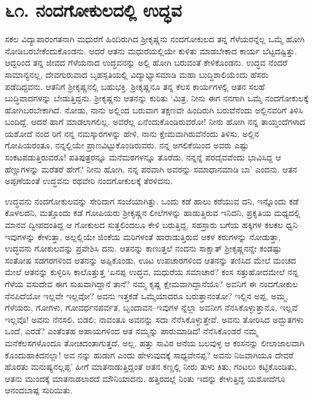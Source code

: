 
\chapter{೬೧. ನಂದಗೋಕುಲದಲ್ಲಿ ಉದ್ಧವ}

ಸಕಲ ವಿದ್ಯಾಪಾರಂಗತನಾಗಿ ಮಧುರೆಗೆ ಹಿಂದಿರುಗಿದ ಶ್ರೀಕೃಷ್ಣನು ನಂದಗೋಕುಲದ ತನ್ನ ಗೆಳೆಯರನ್ನೆಲ್ಲ ಒಮ್ಮೆ ಹೋಗಿ ನೋಡಿಬರಬೇಕೆಂದುಕೊಂಡನು. ಆದರೆ ಆತನು ಮಧುರೆಯಲ್ಲಿಯೇ ಕುಳಿತು ಮಾಡಬೇಕಾದ ಕಾರ್ಯ ಬೆಟ್ಟದಷ್ಟಿತ್ತು. ಆದ್ದರಿಂದ ತನ್ನ ಜೀವದ ಗೆಳೆಯನಾದ ಉದ್ಧವನನ್ನು ಅಲ್ಲಿ ಹೋಗಿ ಬರುವಂತೆ ಕೇಳಿಕೊಂಡನು. ಉದ್ಧವ ನೆಂದರೆ ಸಾಮಾನ್ಯನಲ್ಲ, ದೇವಗುರುವಾದ ಬೃಹಸ್ಪತಿಯಲ್ಲಿ ವಿದ್ಯಾಭ್ಯಾಸಮಾಡಿ ಮಹಾ ಬುದ್ಧಿಶಾಲಿಯೆಂದು ಹೆಸರು ಪಡೆದಿದ್ದವನು. ಆತನಿಗೆ ಶ್ರೀಕೃಷ್ಣನಲ್ಲಿ ಬಹುಭಕ್ತಿ. ಶ್ರೀಕೃಷ್ಣನೂ ತನ್ನ ಕೆಲಸ ಕಾರ್ಯಗಳಲ್ಲಿ ಆತನ ಸಲಹೆ ಬುದ್ಧಿವಾದಗಳನ್ನು ಬೇಡುತ್ತಿದ್ದನು. ಶ್ರೀಕೃಷ್ಣನು ಆತನನ್ನು ಕುರಿತು ‘ಮಿತ್ರ, ನೀನು ಈಗ ನನಗಾಗಿ ಒಮ್ಮೆ ನಂದಗೋಕುಲಕ್ಕೆ ಹೋಗಿಬರಬೇಕಾಗಿದೆ. ನೋಡು, ನಾನು ಅಲ್ಲಿಂದ ಬರುವಾಗ ತಕ್ಷಣವೇ ಹಿಂದಿರುಗಿ ಬರುವೆನೆಂದು ಅಲ್ಲಿನವರಿಗೆ ತಿಳಿಸಿ ಬಂದಿದ್ದೆ. ಆದರೆ ಹಾಗೆ ಮಾಡಲಾಗಲಿಲ್ಲ. ಅವರೆಲ್ಲ ಏನೆಂದುಕೊಂಡಿರುವರೋ! ನೀನು ಹೋಗಿ ನನ್ನ ತಾಯ್ತಂದೆಗಳಾದ ಯಶೋದೆ ನಂದ ರಿಗೆ ನನ್ನ ನಮಸ್ಕಾರಗಳನ್ನು ಹೇಳಿ, ನಾನು ಕ್ಷೇಮವಾಗಿರುವೆನೆಂದು ತಿಳಿಸು. ಅಲ್ಲಿನ ಗೋಪಿಯರಂತೂ, ನನ್ನಲ್ಲಿಯೇ ಪ್ರಾಣವಿಟ್ಟುಕೊಂಡಿರುವರು. ನನ್ನ ಅಗಲಿಕೆಯಿಂದ ಅವರು ಎಷ್ಟು ಸಂಕಟಪಡುತ್ತಿರುವರೊ! ಪತಿಪುತ್ರರನ್ನೂ ಮನೆಮಠಗಳನ್ನೂ ತೊರೆದು, ನನ್ನನ್ನೆ ಪರದೈವವೆಂದು ಭಾವಿಸಿದ್ದ ಆ ಹೆಣ್ಣುಗಳನ್ನು ಮರೆತರೆ ಹೇಗೆ? ನೀನು ಹೋಗಿ, ನನ್ನ ಪರವಾಗಿ ಅವರನ್ನು ಸಮಾಧಾನಮಾಡಿ ಬಾ’ ಎಂದನು. ಆತನ ಅಪ್ಪಣೆಯಂತೆ ಉದ್ಧವನು ರಥವೇರಿ ನಂದಗೋಕುಲಕ್ಕೆ ತೆರಳಿದನು.

ಉದ್ಧವನು ನಂದಗೋಕುಲವನ್ನು ಸೇರಿದಾಗ ಸಂಜೆಯಾಗಿತ್ತು. ಒಂದು ಕಡೆ ಹಾಲು ಕರೆಯುವ ದನಿ, ಇನ್ನೊಂದು ಕಡೆ ಕೊಳಲದನಿ, ಮತ್ತೊಂದು ಕಡೆ ಗೋಪಿಯರು ಶ್ರೀಕೃಷ್ಣನ ಲೀಲೆಗಳನ್ನು ಹಾಡುತ್ತಿರುವ ಇನಿದನಿ, ಪ್ರಕೃತಿಯ ಮಧ್ಯದಲ್ಲಿ ಮಾನವ ದ್ವೀಪದಂತಿದ್ದ ಆ ಗೋಕುಲದ ಸುತ್ತಲಿಂದಲೂ ಕೇಳಿ ಬರುತ್ತಿದ್ದ, ಸಹಸ್ರಾರು ಬಗೆಯ ಹಕ್ಕಿಗಳ ಕಲಕಲ ಧ್ವನಿ–ಇವುಗಳನ್ನು ಕೇಳುತ್ತಾ, ಅಲ್ಲಲ್ಲಿಯೇ ಜಿಂಕೆಯ ಮರಿಗಳಂತೆ ಹಾರಾಡುತ್ತಿರುವ ಆಕಳ ಕರುಗಳನ್ನು ನೋಡುತ್ತಾ, ಉದ್ಧವನು ಗೋಕುಲವನ್ನು ಪ್ರವೇಶಿಸಿ ದನು. ಆತನನ್ನು ಕಾಣುತ್ತಲೆ ನಂದನು ಸಾಕ್ಷಾತ್ ಶ್ರೀಕೃಷ್ಣನನ್ನೇ ಕಂಡಷ್ಟು ಸಂತೋಷ ಸಡಗರಗಳಿಂದ ಆತನನ್ನು ಅಪ್ಪಿಕೊಂಡು, ಊಟ ಉಪಚಾರಗಳಿಂದ ಆತನನ್ನು ತಣಿಸಿದ ಮೇಲೆ ಮಂಚದ ಮೇಲೆ ಆತನನ್ನು ಕುಳ್ಳಿರಿಸಿ ಕಾಲೊತ್ತುತ್ತ ‘ಏನಪ್ಪ ಉದ್ಧವ, ಮಧುರೆಯ ಸಮಾಚಾರ? ಕಂಸ ಸತ್ತುಹೋದಮೇಲೆ ನನ್ನ ಗೆಳೆಯ ವಸುದೇವ ಈಗ ಸುಖವಾಗಿದ್ದಾನೆ ತಾನೆ? ನಮ್ಮ ಕೃಷ್ಣ ಕ್ಷೇಮವಾಗಿದ್ದಾನೆಯೊ? ಅವನಿಗೆ ಈ ನಂದಗೋಕುಲ ನೆನಪಿದೆಯೋ ಇಲ್ಲವೇ ಇಲ್ಲವೋ? ಅವನು ಇತ್ತಕಡೆ ಒಮ್ಮೆಯಾದರೂ ಬರುತ್ತಾನಂತೋ? ಇಲ್ಲಿನ ಅಪ್ಪ, ಅಮ್ಮ, ಗೆಳೆಯರು, ಗೋಗಳು, ಗೋವರ್ಧನಪರ್ವತ, ಬೃಂದಾವನ–ಇವುಗಳ ನ್ನೆಲ್ಲಾ ಅವನೀಗ ನೆನಸಿಕೊಳ್ಳುತ್ತಾನೊ, ಇಲ್ಲವೆ ಇಲ್ಲವೊ! ಅವನು ನೆನಸಲಿ, ಬಿಡಲಿ; ನಾವಂತೂ ಅವನನ್ನು ಸದಾ ನೆನೆಸಿಕೊಳ್ಳುತ್ತೇವೆ. ಅವನು ತೋರಿಸಿದ ಅದ್ಭುತಗಳು ಒಂದೆ, ಎರಡೆ? ಎಂತೆಂತಹ ಅಪಾಯಗಳಿಂದ ಆತ ನಮ್ಮನ್ನು ಪಾರುಮಾಡಿದ! ನೆನೆಸಿಕೊಂಡರೆ ನಮ್ಮ ಮನೆಕೆಲಸಗಳೊಂದೂ ತೋಚದಂತಾಗುತ್ತದೆ. ಅಲ್ಲ, ಹತ್ತು ಸಾವಿರ ಆನೆಯ ಬಲವುಳ್ಳ ಆ ಕಂಸನನ್ನು ಲೀಲಾಜಾಲವಾಗಿ ಕೊಂದುಹಾಕಿದನಲ್ಲಾ! ಅವ ನನ್ನು ಹುಡುಗ ಎಂದು ಹೇಳುವುದಕ್ಕೆ ಸಾಧ್ಯವೇನಪ್ಪ? ಅವನು ನಿಜವಾಗಿಯೂ ದೇವರೆ ಹೊರತು ಮನುಷ್ಯನಲ್ಲಪ್ಪ’ ಹೀಗೆ ಮಾತನಾಡುತ್ತಿದ್ದಂತೆ ಆತನ ಕಣ್ಣಲ್ಲಿ ನೀರು ತುಳು ಕಿತು, ಗಂಟಲು ಕಟ್ಟಿಕೊಂಡಿತು, ಆತನು ಮುಂದಕ್ಕೆ ಮಾತನಾಡಲಾರದೆ ಮೌನಿಯಾದನು. ಹತ್ತಿರದಲ್ಲೆ ನಿಂತು ಇದನ್ನು ಕೇಳುತ್ತಿದ್ದ ಯಶೋದೆಗೂ ಆನಂದಬಾಷ್ಪ ಸುರಿಯಿತು.

